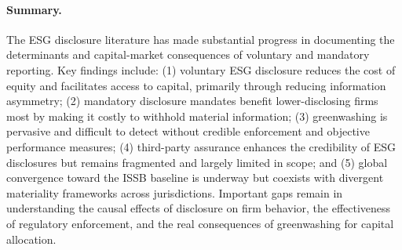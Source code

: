 \paragraph{Summary.}

The ESG disclosure literature has made substantial progress in documenting the
determinants and capital-market consequences of voluntary and mandatory
reporting. Key findings include: (1) voluntary ESG disclosure reduces the cost
of equity and facilitates access to capital, primarily through reducing
information asymmetry; (2) mandatory disclosure mandates benefit lower-disclosing
firms most by making it costly to withhold material information; (3) greenwashing
is pervasive and difficult to detect without credible enforcement and objective
performance measures; (4) third-party assurance enhances the credibility of ESG
disclosures but remains fragmented and largely limited in scope; and (5) global
convergence toward the ISSB baseline is underway but coexists with divergent
materiality frameworks across jurisdictions. Important gaps remain in
understanding the causal effects of disclosure on firm behavior, the
effectiveness of regulatory enforcement, and the real consequences of
greenwashing for capital allocation.
